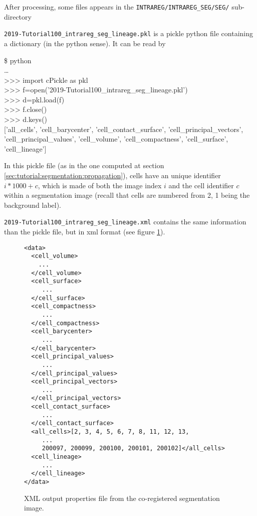 After processing, some files appears in the \texttt{INTRAREG/INTRAREG\_SEG/SEG/} sub-directory 

\mbox{}
\mbox{}


\texttt{2019-Tutorial100\_intrareg\_seg\_lineage.pkl} is a pickle python file
containing a dictionary (in the python sense). It can be read by
\begin{code}{0.8}
  \$ python \\
  \ldots \\
  >>> import cPickle as pkl \\
  >>> f=open('2019-Tutorial100\_intrareg\_seg\_lineage.pkl') \\
  >>> d=pkl.load(f) \\
  >>> f.close()  \\
  >>> d.keys() \\{}
  ['all\_cells', 'cell\_barycenter', 'cell\_contact\_surface', 'cell\_principal\_vectors', 'cell\_principal\_values', 'cell\_volume', 'cell\_compactness', 'cell\_surface', 'cell\_lineage']
\end{code}
In this pickle file (as in the one computed at section
\ref{sec:tutorial:segmentation:propagation}), cells have an unique
identifier $i * 1000 + c$, which is made of 
both the image index $i$ and the cell identifier $c$ within a segmentation
image (recall that cells are numbered from 2, 1 being the background
label).

\texttt{2019-Tutorial100\_intrareg\_seg\_lineage.xml} contains the
same information than the pickle file, but in xml format (see figure
\ref{fig:tutorial:seg:properties:xml}).

\begin{figure}
\begin{framed}
\begin{verbatim}
<data>
  <cell_volume>
    ...
  </cell_volume>
  <cell_surface>
     ...
  </cell_surface>
  <cell_compactness>
     ...
  </cell_compactness>
  <cell_barycenter>
     ...
  </cell_barycenter>
  <cell_principal_values>
     ...
  </cell_principal_values>
  <cell_principal_vectors>
     ...
  </cell_principal_vectors>
  <cell_contact_surface>
     ...
  </cell_contact_surface>
  <all_cells>[2, 3, 4, 5, 6, 7, 8, 11, 12, 13, 
     ...
     200097, 200099, 200100, 200101, 200102]</all_cells>
  <cell_lineage>
     ...
  </cell_lineage>
</data>
\end{verbatim}
\end{framed}
\caption{\label{fig:tutorial:seg:properties:xml} XML output properties
  file from the co-registered segmentation image.}
\end{figure}

